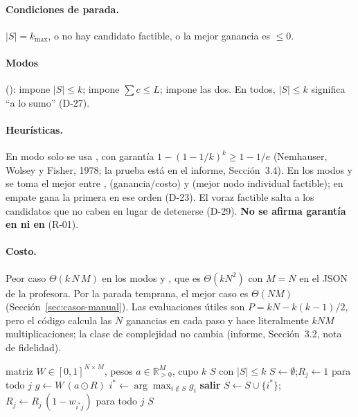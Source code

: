 \documentclass[11pt,a4paper]{article}
\newcommand{\Rea}{\mathbb{R}}
\begin{document}
\paragraph{Condiciones de parada.} $|S|=k_{\max}$, o no hay candidato factible, o la mejor ganancia es $\le 0$.

\paragraph{Modos} ():  impone $|S|\le k$;  impone $\sum c\le L$;  impone las dos. En todos, $|S|\le k$ significa ``a lo sumo'' (D-27).

\paragraph{Heurísticas.} En modo  solo se usa , con garantía $1-(1-1/k)^k\ge 1-1/e$ (Nemhauser, Wolsey y Fisher, 1978; la prueba está en el informe, Sección~3.4). En los modos  y  se toma el mejor entre ,  (ganancia/costo) y  (mejor nodo individual factible); en empate gana la primera en ese orden (D-23). El voraz factible salta a los candidatos que no caben en lugar de detenerse (D-29). \textbf{No se afirma garantía en  ni en } (R-01).

\paragraph{Costo.} Peor caso $\Theta(k\,N\,M)$ en los modos  y , que es $\Theta(kN^2)$ con $M=N$ en el JSON de la profesora. Por la parada temprana, el mejor caso es $\Theta(NM)$ (Sección~\ref{sec:casos-manual}). Las evaluaciones útiles son $P=kN-k(k-1)/2$, pero el código calcula las $N$ ganancias en cada paso y hace literalmente $kNM$ multiplicaciones; la clase de complejidad no cambia (informe, Sección~3.2, nota de fidelidad).

\begin{algorithm}[ht]
\caption{Voraz por ganancia marginal (Parte 2, modo \texttt{k})}\label{alg:voraz}
\begin{algorithmic}[1]
\Require matriz $W\in[0,1]^{N\times M}$, pesos $a\in\Rea_{>0}^{M}$, cupo $k$
\Ensure $S$ con $|S|\le k$
\State $S\gets\emptyset$;\quad $R_j\gets 1$ para todo $j$
  \State $g\gets W\,(a\odot R)$ 
  \State $i^\ast\gets\arg\max_{i\notin S} g_i$ 
   \State \textbf{salir} \EndIf
  \State $S\gets S\cup\{i^\ast\}$;\quad $R_j\gets R_j\,(1-w_{i^\ast j})$ para todo $j$
\EndWhile
\State \Return $S$
\end{algorithmic}
\end{algorithm}
\end{document}
